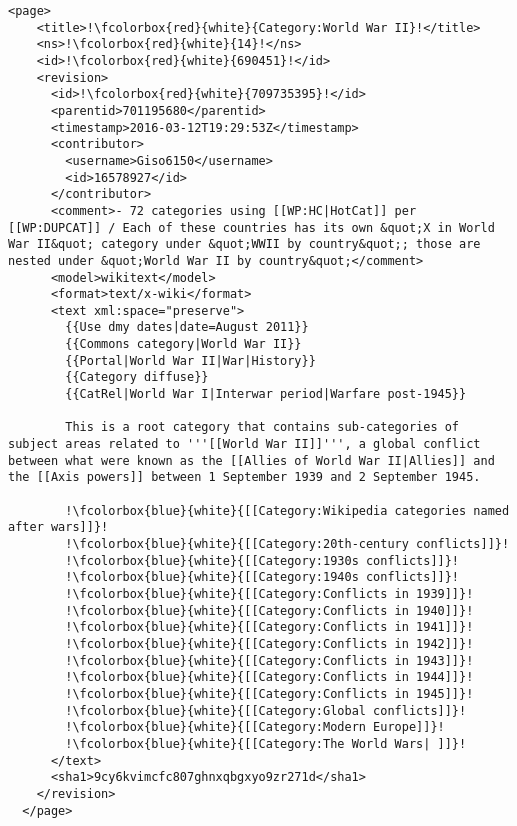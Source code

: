 \begin{lstlisting}[caption= Auszug einer Kategorieseite im XML Format. Rot markierte Bereiche sind durch das XML Format extrahierbar. Blau markierte Bereiche sind im Flie"stext einer Wikipediaseite und m"ussen mit regul"aren Ausdr"ucken extrahiert werden., label=xml-kategorie]
  <page>
    <title>!\fcolorbox{red}{white}{Category:World War II}!</title>
    <ns>!\fcolorbox{red}{white}{14}!</ns>
    <id>!\fcolorbox{red}{white}{690451}!</id>
    <revision>
      <id>!\fcolorbox{red}{white}{709735395}!</id>
      <parentid>701195680</parentid>
      <timestamp>2016-03-12T19:29:53Z</timestamp>
      <contributor>
        <username>Giso6150</username>
        <id>16578927</id>
      </contributor>
      <comment>- 72 categories using [[WP:HC|HotCat]] per [[WP:DUPCAT]] / Each of these countries has its own &quot;X in World War II&quot; category under &quot;WWII by country&quot;; those are nested under &quot;World War II by country&quot;</comment>
      <model>wikitext</model>
      <format>text/x-wiki</format>
      <text xml:space="preserve">
        {{Use dmy dates|date=August 2011}}
        {{Commons category|World War II}}
        {{Portal|World War II|War|History}}
        {{Category diffuse}}
        {{CatRel|World War I|Interwar period|Warfare post-1945}}
        
        This is a root category that contains sub-categories of subject areas related to '''[[World War II]]''', a global conflict between what were known as the [[Allies of World War II|Allies]] and the [[Axis powers]] between 1 September 1939 and 2 September 1945.
        
        !\fcolorbox{blue}{white}{[[Category:Wikipedia categories named after wars]]}!
        !\fcolorbox{blue}{white}{[[Category:20th-century conflicts]]}!
        !\fcolorbox{blue}{white}{[[Category:1930s conflicts]]}!
        !\fcolorbox{blue}{white}{[[Category:1940s conflicts]]}!
        !\fcolorbox{blue}{white}{[[Category:Conflicts in 1939]]}!
        !\fcolorbox{blue}{white}{[[Category:Conflicts in 1940]]}!
        !\fcolorbox{blue}{white}{[[Category:Conflicts in 1941]]}!
        !\fcolorbox{blue}{white}{[[Category:Conflicts in 1942]]}!
        !\fcolorbox{blue}{white}{[[Category:Conflicts in 1943]]}!
        !\fcolorbox{blue}{white}{[[Category:Conflicts in 1944]]}!
        !\fcolorbox{blue}{white}{[[Category:Conflicts in 1945]]}!
        !\fcolorbox{blue}{white}{[[Category:Global conflicts]]}!
        !\fcolorbox{blue}{white}{[[Category:Modern Europe]]}!
        !\fcolorbox{blue}{white}{[[Category:The World Wars| ]]}!
      </text>
      <sha1>9cy6kvimcfc807ghnxqbgxyo9zr271d</sha1>
    </revision>
  </page>
\end{lstlisting}











